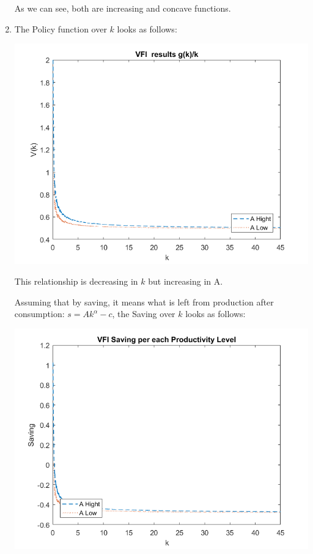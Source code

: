 \documentclass[12pt]{article}%
\begin{document}
\begin{enumerate}
	
	As we can see, both are increasing and concave functions. 
	
	\item  The Policy function over $k$ looks as follows:
	
	\begin{center}
		\includegraphics[width=1\linewidth]{g_k}
	\end{center}

This relationship is decreasing in $k$ but increasing in A.
	
	Assuming that by saving, it means what is left from production after consumption: $s=Ak^\alpha-c$, the Saving over $k$ looks as follows:
	
	\begin{center}
		\includegraphics[width=1\linewidth]{saving}
	\end{center}
	

\end{enumerate}
\end{document}
